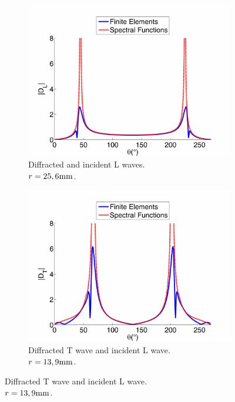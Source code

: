 \begin{figure}%
\centering
    \begin{subfigure}[b]{0.49\textwidth}
        \includegraphics[width=\textwidth]{images/chapter3/Figure11a.pdf}
        \caption{Diffracted and incident L waves. \\$r=25,6 \rm mm$.}
        \label{DLL}
    \end{subfigure}  
    \begin{subfigure}[b]{0.49\textwidth}
        \includegraphics[width=\textwidth]{images/chapter3/Figure11b.pdf}
        \caption{Diffracted T wave and incident L wave. \\$r=13,9 \rm mm$.}
        \label{DLT}
     \end{subfigure}   

\end{figure}
